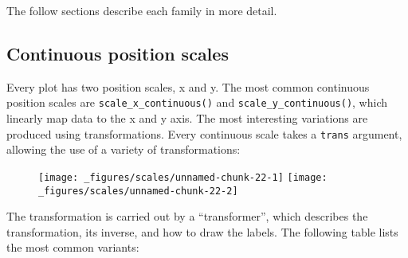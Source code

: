 The follow sections describe each family in more detail.

\hypertarget{sub:scale-position}{%
\subsection{Continuous position scales}\label{sub:scale-position}}

Every plot has two position scales, x and y. 
 The most common continuous position scales
are \texttt{scale\_x\_continuous()} and \texttt{scale\_y\_continuous()},
which linearly map data to the x and y axis. 
  The most
interesting variations are produced using transformations. Every
continuous scale takes a \texttt{trans} argument, allowing the use of a
variety of transformations:

\begin{Shaded}
\begin{Highlighting}[]
\OperatorTok{+}\StringTok{ }
\StringTok{  }\NormalTok{() }\OperatorTok{+}\StringTok{ }
\StringTok{  }\NormalTok{(} \NormalTok{)}

\OperatorTok{+}\StringTok{ }
\StringTok{  }\NormalTok{() }\OperatorTok{+}\StringTok{ }
\StringTok{  }\NormalTok{(} \NormalTok{) }\OperatorTok{+}
\StringTok{  }\NormalTok{(} \NormalTok{)}
\end{Highlighting}
\end{Shaded}

\begin{figure}[H]
  \texttt{[image: \_figures/scales/unnamed-chunk-22-1]}%
  \texttt{[image: \_figures/scales/unnamed-chunk-22-2]}
\end{figure}

The transformation is carried out by a ``transformer'', which describes
the transformation, its inverse, and how to draw the labels. The
following table lists the most common variants:

